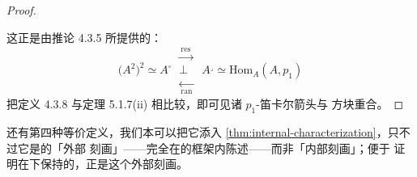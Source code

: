 \begin{proof}
\begin{center}
\end{center}
这正是由推论 4.3.5 所提供的：
\[
\bigl(A^{2}\bigr)^{2}\simeq A^{\square}
\;\begin{array}{c}
\xrightarrow{\ \mathrm{res}\ }\\
\perp\\
\xleftarrow[\ \mathrm{ran}\ ]{}
\end{array}\;
A^{\lrcorner}\simeq\mathrm{Hom}_{A}(A,p_{1})
\]
把定义 4.3.8 与定理 5.1.7(ii) 相比较，即可见诸 $p_{1}$-笛卡尔箭头与\trPullback{}%
方块重合。
\end{proof}

\trCartesianFibration{}还有第四种等价定义，我们本可以把它添入%
\cref{thm:internal-characterization}，只不过它是\trCartesianFibration{}的「外部
刻画」——完全在\trHomotopyTwoCategory{}的框架内陈述——而非「内部刻画」；便于
证明\trCartesianFibration{}在\trCosmologicalFunctor{}下保持的，正是这个外部刻画。

